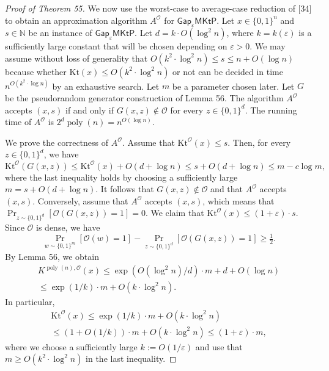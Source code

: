 \begin{proof}[Proof of Theorem 55]
We now use the worst-case to average-case reduction of [34] to obtain an approximation algorithm $A^{\mathcal O}$ for $\mathsf{Gap}_{\varepsilon}\mathsf{MKtP}$. Let $x\in\{0,1\}^n$ and $s\in\mathbb N$ be an instance of $\mathsf{Gap}_{\varepsilon}\mathsf{MKtP}$. Let $d=k\cdot O(\log^2 n)$, where $k=k(\varepsilon)$ is a sufficiently large constant that will be chosen depending on $\varepsilon>0$. We may assume without loss of generality that $O(k^2\cdot\log^2 n)\leq s\leq n+O(\log n)$ because whether $\mathrm{Kt}(x)\leq O(k^2\cdot\log^2 n)$ or not can be decided in time $n^{O(k^2\cdot\log n)}$ by an exhaustive search. Let $m$ be a parameter chosen later. Let $G$ be the pseudorandom generator construction of Lemma 56. The algorithm $A^{\mathcal O}$ accepts $(x,s)$ if and only if $G(x,z)\notin\mathcal O$ for every $z\in\{0,1\}^d$. The running time of $A^{\mathcal O}$ is $2^d\operatorname{poly}(n)=n^{O(\log n)}$.

We prove the correctness of $A^{\mathcal O}$. Assume that $\mathrm{Kt}^{\mathcal O}(x)\leq s$. Then, for every $z\in\{0,1\}^d$, we have
\[\mathrm{Kt}^{\mathcal O}(G(x,z))\leq\mathrm{Kt}^{\mathcal O}(x)+O(d+\log n)\leq s+O(d+\log n)\leq m-c\log m,\]
where the last inequality holds by choosing a sufficiently large $m=s+O(d+\log n)$. It follows that $G(x,z)\notin\mathcal O$ and that $A^{\mathcal O}$ accepts $(x,s)$. Conversely, assume that $A^{\mathcal O}$ accepts $(x,s)$, which means that $\Pr_{z\sim\{0,1\}^d}[\mathcal O(G(x,z))=1]=0$. We claim that $\mathrm{Kt}^{\mathcal O}(x)\leq(1+\varepsilon)\cdot s$. Since $\mathcal O$ is dense, we have
\[\Pr_{w\sim\{0,1\}^m}[\mathcal O(w)=1]-\Pr_{z\sim\{0,1\}^d}[\mathcal O(G(x,z))=1]\geq\tfrac12.\]
By Lemma 56, we obtain
\begin{multline*}
K^{\operatorname{poly}(n),\mathcal O}(x)\leq\exp(O(\log^2 n)/d)\cdot m+d+O(\log n)\\
\leq\exp(1/k)\cdot m+O(k\cdot\log^2 n).
\end{multline*}
In particular,
\begin{multline*}
\mathrm{Kt}^{\mathcal O}(x)\leq\exp(1/k)\cdot m+O(k\cdot\log^2 n)\\
\leq(1+O(1/k))\cdot m+O(k\cdot\log^2 n)\leq(1+\varepsilon)\cdot m,
\end{multline*}
where we choose a sufficiently large $k:=O(1/\varepsilon)$ and use that $m\geq O(k^2\cdot\log^2 n)$ in the last inequality.
\end{proof}
